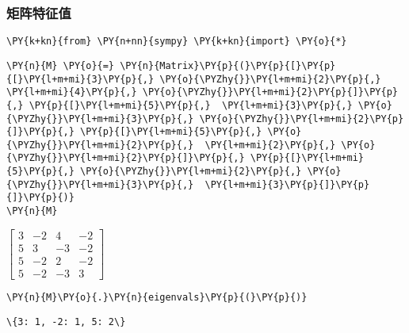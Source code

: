     \hypertarget{ux77e9ux9635ux7279ux5f81ux503c}{%
\subsubsection{矩阵特征值}\label{ux77e9ux9635ux7279ux5f81ux503c}}

    \begin{tcolorbox}[breakable, size=fbox, boxrule=1pt, pad at break*=1mm,colback=cellbackground, colframe=cellborder]
\begin{Verbatim}[commandchars=\\\{\}]
\PY{k+kn}{from} \PY{n+nn}{sympy} \PY{k+kn}{import} \PY{o}{*}
\end{Verbatim}
\end{tcolorbox}

    \begin{tcolorbox}[breakable, size=fbox, boxrule=1pt, pad at break*=1mm,colback=cellbackground, colframe=cellborder]
\begin{Verbatim}[commandchars=\\\{\}]
\PY{n}{M} \PY{o}{=} \PY{n}{Matrix}\PY{p}{(}\PY{p}{[}\PY{p}{[}\PY{l+m+mi}{3}\PY{p}{,} \PY{o}{\PYZhy{}}\PY{l+m+mi}{2}\PY{p}{,}  \PY{l+m+mi}{4}\PY{p}{,} \PY{o}{\PYZhy{}}\PY{l+m+mi}{2}\PY{p}{]}\PY{p}{,} \PY{p}{[}\PY{l+m+mi}{5}\PY{p}{,}  \PY{l+m+mi}{3}\PY{p}{,} \PY{o}{\PYZhy{}}\PY{l+m+mi}{3}\PY{p}{,} \PY{o}{\PYZhy{}}\PY{l+m+mi}{2}\PY{p}{]}\PY{p}{,} \PY{p}{[}\PY{l+m+mi}{5}\PY{p}{,} \PY{o}{\PYZhy{}}\PY{l+m+mi}{2}\PY{p}{,}  \PY{l+m+mi}{2}\PY{p}{,} \PY{o}{\PYZhy{}}\PY{l+m+mi}{2}\PY{p}{]}\PY{p}{,} \PY{p}{[}\PY{l+m+mi}{5}\PY{p}{,} \PY{o}{\PYZhy{}}\PY{l+m+mi}{2}\PY{p}{,} \PY{o}{\PYZhy{}}\PY{l+m+mi}{3}\PY{p}{,}  \PY{l+m+mi}{3}\PY{p}{]}\PY{p}{]}\PY{p}{)}
\PY{n}{M}
\end{Verbatim}
\end{tcolorbox}
 
            
    
    $\displaystyle \left[\begin{matrix}3 & -2 & 4 & -2\\5 & 3 & -3 & -2\\5 & -2 & 2 & -2\\5 & -2 & -3 & 3\end{matrix}\right]$

    

    \begin{tcolorbox}[breakable, size=fbox, boxrule=1pt, pad at break*=1mm,colback=cellbackground, colframe=cellborder]
\begin{Verbatim}[commandchars=\\\{\}]
\PY{n}{M}\PY{o}{.}\PY{n}{eigenvals}\PY{p}{(}\PY{p}{)}
\end{Verbatim}
\end{tcolorbox}

            \begin{tcolorbox}[breakable, size=fbox, boxrule=.5pt, pad at break*=1mm, opacityfill=0]
\begin{Verbatim}[commandchars=\\\{\}]
\{3: 1, -2: 1, 5: 2\}
\end{Verbatim}
\end{tcolorbox}
